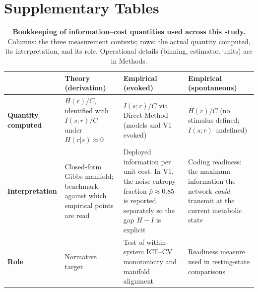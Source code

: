 \documentclass[11pt]{article}
\theoremstyle{remark}
\theoremstyle{definition}
\begin{document}
\newpage


\section{Supplementary Tables}

\begin{table}[h!]
\centering
\small
\caption{\textbf{Bookkeeping of information--cost quantities used across this study.}  Columns: the three measurement contexts; rows: the actual quantity computed, its interpretation, and its role.  Operational details (binning, estimator, units) are in Methods.}
\label{tab:bookkeeping}
\begin{tabular}{p{2.2cm}p{3.4cm}p{3.4cm}p{3.4cm}}
\toprule
 & \textbf{Theory (derivation)} & \textbf{Empirical (evoked)} & \textbf{Empirical (spontaneous)} \\
\midrule
\textbf{Quantity computed} &
$H(r)/C$, identified with $I(s;r)/C$ under $H(r|s)\approx 0$ &
$I(s;r)/C$ via Direct Method (models and V1 evoked) &
$H(r)/C$ (no stimulus defined; $I(s;r)$ undefined) \\
\addlinespace
\textbf{Interpretation} &
Closed-form Gibbs manifold; benchmark against which empirical points are read &
Deployed information per unit cost.  In V1, the noise-entropy fraction $\bar\rho\approx 0.85$ is reported separately so the gap $H-I$ is explicit &
Coding readiness: the maximum information the network \emph{could} transmit at the current metabolic state \\
\addlinespace
\textbf{Role} &
Normative target &
Test of within-system ICE--CV monotonicity and manifold alignment &
Readiness measure used in resting-state comparisons \\
\bottomrule
\end{tabular}
\end{table}
\end{document}
